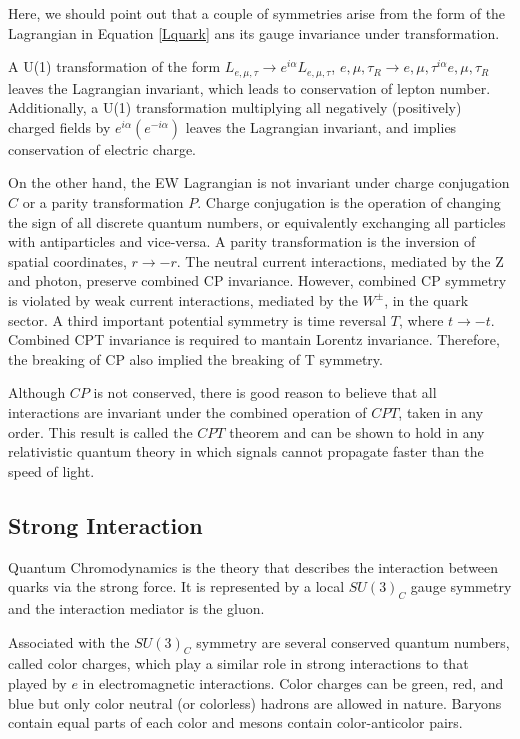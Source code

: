 Here, we should point out that a couple of symmetries arise from the form of the Lagrangian in Equation \ref{Lquark} ans its gauge invariance under transformation.

A U(1) transformation of the form $L_{e,\mu,\tau}\rightarrow e^{i\alpha}L_{e,\mu,\tau}$, $e,\mu,\tau_{R}\rightarrow e,\mu,\tau^{i\alpha}e,\mu,\tau_{R}$ leaves the Lagrangian invariant, which leads to conservation of lepton number. Additionally, a U(1) transformation multiplying all negatively (positively) charged fields by $e^{i\alpha}(e^{-i\alpha})$ leaves the Lagrangian invariant, and implies conservation of electric charge.

On the other hand, the EW Lagrangian is not invariant under charge conjugation $C$ or a parity transformation $P$. Charge conjugation is the operation of changing the sign of all discrete quantum numbers, or equivalently exchanging all particles with antiparticles and vice-versa. A parity transformation is the inversion of spatial coordinates, $r\rightarrow -r$. The neutral current interactions, mediated by the Z and photon, preserve combined CP invariance. However, combined CP symmetry is violated by weak current interactions, mediated by the $W^{\pm}$, in the quark sector. A third important potential symmetry is time reversal $T$, where $t\rightarrow -t$. Combined CPT invariance is required to mantain Lorentz invariance. Therefore, the breaking of CP also implied the breaking of T symmetry.

Although $CP$ is not conserved, there is good reason to believe that all interactions are invariant under the combined operation of $CPT$, taken in any order. This result is called the $CPT$ theorem and can be shown to hold in any relativistic quantum theory in which signals cannot propagate faster than the speed of light.

\subsection{Strong Interaction}

Quantum Chromodynamics is the theory that describes the interaction between quarks via the strong force. It is represented by a local $SU(3)_{C}$ gauge symmetry and the interaction mediator is the gluon.

Associated with the $SU(3)_{C}$ symmetry are several conserved quantum numbers, called color charges, which play a similar role in strong interactions to that played by $e$ in electromagnetic interactions. Color charges can be green, red, and blue but only color neutral (or colorless) hadrons are allowed in nature. Baryons contain equal parts of each color and mesons contain color-anticolor pairs.

